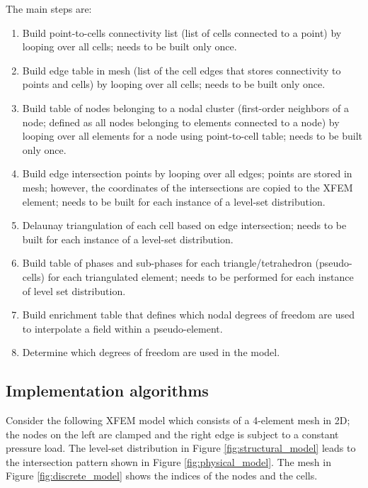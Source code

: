 The main steps are:
\begin{enumerate}
\item Build point-to-cells connectivity list (list of cells connected to a point) by looping over all cells; needs to be built only once.
\item Build edge table in mesh (list of the cell edges that stores connectivity to points and cells) by looping over all cells; needs to be built only once.
\item Build table of nodes belonging to a nodal cluster (first-order neighbors of a node; defined as all nodes belonging to elements connected to a node) by looping over all elements for a node using point-to-cell table; needs to be built only once.
\item Build edge intersection points by looping over all edges; points are stored in mesh; however, the coordinates of the intersections are copied to the XFEM element; needs to be built for each instance of a level-set distribution.
\item Delaunay triangulation of each cell based on edge intersection; needs to be built for each instance of a level-set distribution.
\item Build table of phases and sub-phases for each triangle/tetrahedron (pseudo-cells) for each triangulated element; needs to be performed for each instance of level set distribution.
\item Build enrichment table that defines which nodal degrees of freedom are used to interpolate a field within a pseudo-element.
\item Determine which degrees of freedom are used in the model.
\end{enumerate}



\subsection{Implementation algorithms}
\label{sec:implementation}

Consider the following XFEM model which consists of a 4-element mesh in 2D; the nodes on the left are clamped and the right edge is subject to a constant pressure load. The level-set distribution in Figure \ref{fig:structural_model} leads to the intersection pattern shown in Figure \ref{fig:physical_model}. The mesh in Figure \ref{fig:discrete_model} shows the indices of the nodes and the cells.

